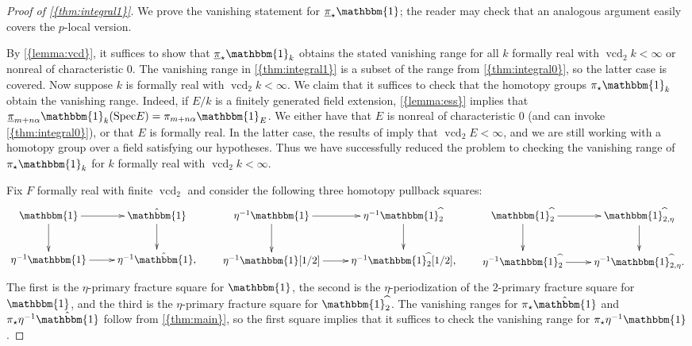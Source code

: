 \documentclass[10pt]{amsart}
\numberwithin{equation}{section}
\theoremstyle{plain}
\theoremstyle{definition}
\theoremstyle{remark}
\begin{document}
\begin{proof}[Proof of {\autoref{{thm:integral1}}}]
We prove the vanishing statement for ${\underline{\smash{\pi}}}_\star{\mathbbm{1}}$; the reader may check that an analogous argument easily covers the $p$-local version.

By {\autoref{{lemma:vcd}}}, it suffices to show that ${\underline{\smash{\pi}}}_\star {\mathbbm{1}}_k$ obtains the stated vanishing range for all $k$ formally real with ${\operatorname{vcd}}_2 k<\infty$ or nonreal of characteristic $0$.  The vanishing range in {\autoref{{thm:integral1}}} is a subset of the range from {\autoref{{thm:integral0}}}, so the latter case is covered.  Now suppose $k$ is formally real with ${\operatorname{vcd}}_2 k<\infty$.  We claim that it suffices to check that the homotopy groups $\pi_\star{\mathbbm{1}}_k$ obtain the vanishing range.  Indeed, if $E/k$ is a finitely generated field extension, {\autoref{{lemma:ess}}} implies that ${\underline{\smash{\pi}}}_{m+n\alpha}{\mathbbm{1}}_k({\operatorname{Spec}} E) = \pi_{m+n\alpha}{\mathbbm{1}}_E$.  We either have that $E$ is nonreal of characteristic $0$ (and can invoke {\autoref{{thm:integral0}}}), or that $E$ is formally real.  In the latter case, the results of \cite[\S II.4.1 \& II.4.2]{serre:gc} imply that ${\operatorname{vcd}}_2 E<\infty$, and we are still working with a homotopy group over a field satisfying our hypotheses.  Thus we have successfully reduced the problem to checking the vanishing range of $\pi_\star{\mathbbm{1}}_k$ for $k$ formally real with ${\operatorname{vcd}}_2 k<\infty$.

Fix $F$ formally real with finite ${\operatorname{vcd}}_2$ and consider the following three homotopy pullback squares:
\[\xymatrix{
  {\mathbbm{1}}\ar[r]\ar[d] &\hat{\mathbbm{1}}\ar[d]\\
  \eta^{-1}{\mathbbm{1}}\ar[r] &\eta^{-1}\hat{\mathbbm{1}}\text{,}
}\qquad
\xymatrix{
  \eta^{-1}{\mathbbm{1}}\ar[r]\ar[d] &\eta^{-1}{\mathbbm{1}}{^{\widehat{~}}_{{2}}}\ar[d]\\
  \eta^{-1}{\mathbbm{1}}[1/2]\ar[r] &\eta^{-1}{\mathbbm{1}}{^{\widehat{~}}_{{2}}}[1/2]\text{,}
}\qquad
\xymatrix{
  {\mathbbm{1}}{^{\widehat{~}}_{{2}}}\ar[r]\ar[d] &{\mathbbm{1}}{^{\widehat{~}}_{{2,\eta}}}\ar[d]\\
  \eta^{-1}{\mathbbm{1}}{^{\widehat{~}}_{{2}}}\ar[r] &\eta^{-1}{\mathbbm{1}}{^{\widehat{~}}_{{2,\eta}}}.
}\]
The first is the $\eta$-primary fracture square for ${\mathbbm{1}}$, the second is the $\eta$-periodization of the $2$-primary fracture square for ${\mathbbm{1}}$, and the third is the $\eta$-primary fracture square for ${\mathbbm{1}}{^{\widehat{~}}_{{2}}}$.  The vanishing ranges for $\pi_\star \hat{\mathbbm{1}}$ and $\pi_\star \eta^{-1}\hat{\mathbbm{1}}$ follow from {\autoref{{thm:main}}}, so the first square implies that it suffices to check the vanishing range for $\pi_\star \eta^{-1}{\mathbbm{1}}$.


\end{proof}
\end{document}
